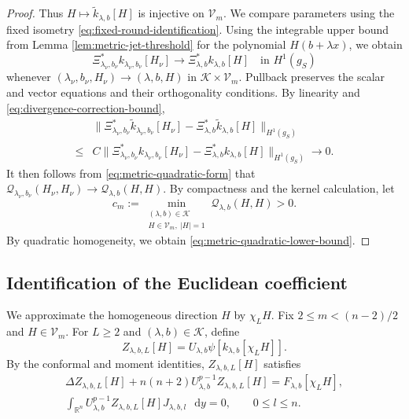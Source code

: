 \documentclass[11pt]{article}
\numberwithin{equation}{section}
\theoremstyle{remark}
\newcommand{\R}{\mathbb R}
\newcommand{\dd}{\mathop{}\!\mathrm{d}}
\begin{document}
\begin{proof}
Thus \(H\mapsto \widetilde k_{\lambda,b}[H]\) is injective on \(\mathcal V_m\).
We compare parameters using the fixed isometry
\eqref{eq:fixed-round-identification}.
{Using the integrable upper bound from
Lemma  \ref{lem:metric-jet-threshold} for the polynomial
\(H(b+\lambda x)\), we obtain}
\[
 \Xi_{\lambda_\nu,b_\nu}^*k_{\lambda_\nu,b_\nu}[H_\nu]
 \to
 \Xi_{\lambda,b}^*k_{\lambda,b}[H]
 \quad\text{in }H^1(g_{S})
\]
whenever \((\lambda_\nu,b_\nu,H_\nu)\to(\lambda,b,H)\) in
\(\mathcal K\times\mathcal V_m\).
Pullback preserves the scalar and vector equations and their
orthogonality conditions. By linearity and
\eqref{eq:divergence-correction-bound},
\[
 \begin{aligned}
 &\|\Xi_{\lambda_\nu,b_\nu}^*\widetilde k_{\lambda_\nu,b_\nu}[H_\nu]
       -\Xi_{\lambda,b}^*\widetilde k_{\lambda,b}[H]\|_{H^1(g_{S})}\\
 {}\le{}&C\|\Xi_{\lambda_\nu,b_\nu}^*k_{\lambda_\nu,b_\nu}[H_\nu]
       -\Xi_{\lambda,b}^*k_{\lambda,b}[H]\|_{H^1(g_{S})}
 \to0.
 \end{aligned}
\]
It then follows from
\eqref{eq:metric-quadratic-form} that \(\mathcal Q_{\lambda_\nu,b_\nu}(H_\nu,H_\nu)
 \to \mathcal Q_{\lambda,b}(H,H)\).
By compactness and the kernel calculation, let
\[
 c_m:=
 \min_{\substack{(\lambda,b)\in\mathcal K\\
 H\in\mathcal V_m,\ |H|=1}}
 \mathcal Q_{\lambda,b}(H,H)>0.
\]
{By quadratic homogeneity, we obtain
\eqref{eq:metric-quadratic-lower-bound}.}
\end{proof}

\subsection{Identification of the Euclidean coefficient}

We approximate the homogeneous direction \(H\) by \(\chi_LH\). Fix \(2\le m<(n-2)/2\) and
\(H\in\mathcal V_m\). For \(L\ge2\) and \((\lambda,b)\in\mathcal K\),
define
\begin{equation}\label{eq:cutoff-response-from-sphere}
 Z_{\lambda,b,L}[H]
 =U_{\lambda,b}\psi[k_{\lambda,b}[\chi_LH]].
\end{equation}
{By the conformal and moment identities,
\(Z_{\lambda,b,L}[H]\) satisfies}
{
\[
 \begin{gathered}
 \Delta Z_{\lambda,b,L}[H]
 +n(n+2)U_{\lambda,b}^{p-1}Z_{\lambda,b,L}[H]
 =F_{\lambda,b}[\chi_LH],\\
 \int_{\R^n}U_{\lambda,b}^{p-1}
 Z_{\lambda,b,L}[H]J_{\lambda,b,l}\,\dd y=0,
 \qquad0\le l\le n.
 \end{gathered}
\]
}
\end{document}
